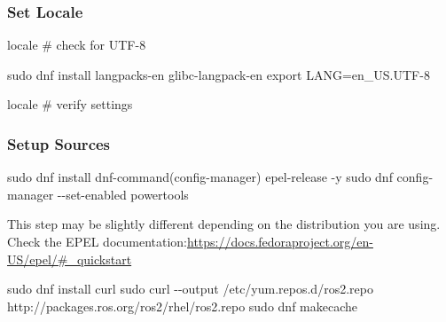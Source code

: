 \documentclass[
  letterpaper,
  DIV=11,
  numbers=noendperiod]{scrreprt}
\newenvironment{Shaded}{\begin{snugshade}}{\end{snugshade}}
\newcommand{\AttributeTok}[1]{\textcolor[rgb]{0.40,0.45,0.13}{#1}}
\newcommand{\BuiltInTok}[1]{\textcolor[rgb]{0.00,0.23,0.31}{#1}}
\newcommand{\CommentTok}[1]{\textcolor[rgb]{0.37,0.37,0.37}{#1}}
\newcommand{\ExtensionTok}[1]{\textcolor[rgb]{0.00,0.23,0.31}{#1}}
\newcommand{\FunctionTok}[1]{\textcolor[rgb]{0.28,0.35,0.67}{#1}}
\newcommand{\NormalTok}[1]{\textcolor[rgb]{0.00,0.23,0.31}{#1}}
\newcommand{\OperatorTok}[1]{\textcolor[rgb]{0.37,0.37,0.37}{#1}}
\newcommand{\StringTok}[1]{\textcolor[rgb]{0.13,0.47,0.30}{#1}}
\newcommand{\VariableTok}[1]{\textcolor[rgb]{0.07,0.07,0.07}{#1}}
\begin{document}
\hypertarget{set-locale-1}{%
\subsubsection{Set Locale}\label{set-locale-1}}

\begin{Shaded}
\begin{Highlighting}[]
\ExtensionTok{locale}  \CommentTok{\# check for UTF{-}8}

\FunctionTok{sudo}\NormalTok{ dnf install langpacks{-}en glibc{-}langpack{-}en}
\BuiltInTok{export} \VariableTok{LANG}\OperatorTok{=}\NormalTok{en\_US.UTF{-}8}

\ExtensionTok{locale}  \CommentTok{\# verify settings}
\end{Highlighting}
\end{Shaded}

\hypertarget{setup-sources-1}{%
\subsubsection{Setup Sources}\label{setup-sources-1}}

\begin{Shaded}
\begin{Highlighting}[]
\FunctionTok{sudo}\NormalTok{ dnf install }\StringTok{\textquotesingle{}dnf{-}command(config{-}manager)\textquotesingle{}}\NormalTok{ epel{-}release }\AttributeTok{{-}y}
\FunctionTok{sudo}\NormalTok{ dnf config{-}manager }\AttributeTok{{-}{-}set{-}enabled}\NormalTok{ powertools}
\end{Highlighting}
\end{Shaded}

\begin{tcolorbox}[enhanced jigsaw, toprule=.15mm, left=2mm, bottomtitle=1mm, toptitle=1mm, colbacktitle=quarto-callout-note-color!10!white, arc=.35mm, bottomrule=.15mm, titlerule=0mm, opacitybacktitle=0.6, breakable, coltitle=black, title=\textcolor{quarto-callout-note-color}{\faInfo}\hspace{0.5em}{Note}, rightrule=.15mm, colback=white, leftrule=.75mm, colframe=quarto-callout-note-color-frame, opacityback=0]

This step may be slightly different depending on the distribution you
are using. Check the EPEL
documentation:\url{https://docs.fedoraproject.org/en-US/epel/\#_quickstart}

\end{tcolorbox}

\begin{Shaded}
\begin{Highlighting}[]
\FunctionTok{sudo}\NormalTok{ dnf install curl}
\FunctionTok{sudo}\NormalTok{ curl }\AttributeTok{{-}{-}output}\NormalTok{ /etc/yum.repos.d/ros2.repo http://packages.ros.org/ros2/rhel/ros2.repo}
\FunctionTok{sudo}\NormalTok{ dnf makecache}
\end{Highlighting}
\end{Shaded}
\end{document}
